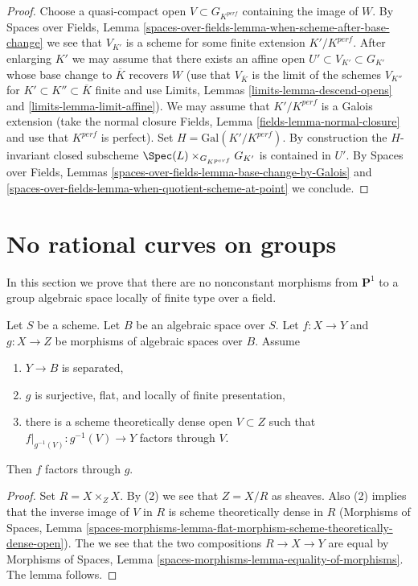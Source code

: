 \begin{proof}
\medskip\noindent
Choose a quasi-compact open $V \subset G_{K^{perf}}$ containing the
image of $W$. By Spaces over Fields,
Lemma \ref{spaces-over-fields-lemma-when-scheme-after-base-change}
we see that $V_{K'}$ is a scheme for some finite extension $K'/K^{perf}$.
After enlarging $K'$ we may assume that there exists an affine open
$U' \subset V_{K'} \subset G_{K'}$ whose base change to $\overline{K}$
recovers $W$ (use that $V_{\overline{K}}$ is the limit of the schemes
$V_{K''}$ for $K' \subset K'' \subset \overline{K}$ finite and use
Limits, Lemmas \ref{limits-lemma-descend-opens} and
\ref{limits-lemma-limit-affine}). We may assume
that $K'/K^{perf}$ is a Galois extension (take the normal closure
Fields, Lemma \ref{fields-lemma-normal-closure} and use
that $K^{perf}$ is perfect). Set $H = \text{Gal}(K'/K^{perf})$.
By construction the $H$-invariant closed subscheme
$\Spec(L) \times_{G_{K^{perf}}} G_{K'}$ is contained in $U'$.
By
Spaces over Fields, Lemmas
\ref{spaces-over-fields-lemma-base-change-by-Galois} and
\ref{spaces-over-fields-lemma-when-quotient-scheme-at-point} we conclude.
\end{proof}





\section{No rational curves on groups}
\label{section-no-rational-curves}

\noindent
In this section we prove that there are no nonconstant morphisms
from $\mathbf{P}^1$ to a group algebraic space locally of finite
type over a field.

\begin{lemma}
\label{lemma-factor-through-over-open}
Let $S$ be a scheme. Let $B$ be an algebraic space over $S$.
Let $f : X \to Y$ and $g : X \to Z$ be morphisms of algebraic
spaces over $B$. Assume
\begin{enumerate}
\item $Y \to B$ is separated,
\item $g$ is surjective, flat, and locally of finite presentation,
\item there is a scheme theoretically dense open $V \subset Z$
such that $f|_{g^{-1}(V)} : g^{-1}(V) \to Y$ factors through $V$.
\end{enumerate}
Then $f$ factors through $g$.
\end{lemma}

\begin{proof}
Set $R = X \times_Z X$. By (2) we see that $Z = X/R$ as sheaves.
Also (2) implies that the inverse image of $V$ in $R$ is scheme
theoretically dense in $R$ (Morphisms of Spaces, Lemma
\ref{spaces-morphisms-lemma-flat-morphism-scheme-theoretically-dense-open}).
The we see that the two compositions
$R \to X \to Y$ are equal by Morphisms of Spaces, Lemma
\ref{spaces-morphisms-lemma-equality-of-morphisms}.
The lemma follows.
\end{proof}

